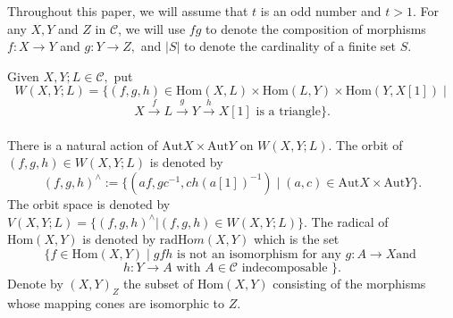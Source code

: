 \documentclass{amsart}
\theoremstyle{definition}
\numberwithin{equation}{section}
\begin{document}
Throughout this paper, we will assume that $t$ is an odd number and
$t>1.$ For any $X, Y$ and $Z$ in ${{\mathcal{C}}}$, we will use $fg$ to denote
the composition of morphisms $f:X\rightarrow Y$ and $g:Y\rightarrow
Z,$ and $|S|$ to denote the cardinality of a finite set $S.$

Given $X,Y;L\in {{\mathcal{C}}},$ put
$$ W(X,Y;L)=\{(f,g,h)\in {\mathrm{Hom}}(X,L)\times
{\mathrm{Hom}}(L,Y)\times {\mathrm{Hom}}(Y,X[1])\mid$$$$
X\xrightarrow{f}L\xrightarrow{g}Y\xrightarrow{h}X[1] \mbox{ is a
triangle}\}.$$ \\
There is a natural action of ${\mbox{Aut}} X\times {\mbox{Aut}} Y$ on $W(X,Y;L).$
The orbit of $(f,g,h)\in W(X,Y;L)$ is denoted by
$$(f,g,h)^{\wedge}:=\{(af,gc^{-1},ch(a[1])^{-1})\mid (a,c)\in {\mbox{Aut}} X\times {\mbox{Aut}} Y\}.$$
The orbit space is denoted by $V(X,Y;L)=\{ (f,g,h)^{\wedge}|(f,g,h)
\in W(X,Y;L)\} .$ The radical of ${\mathrm{Hom}}(X, Y)$ is denoted by
$\mathrm{radHo}m(X, Y)$ which is the set $$\{f\in {\mathrm{Hom}}(X, Y)\mid gfh
\mbox{ is not an isomorphism }\mbox{for any }g: A\rightarrow X\mbox{
and }
$$
$$h:Y\rightarrow A\mbox{ with } A\in {{\mathcal{C}}}\mbox{ indecomposable }\}. $$ Denote by $(X,Y)_Z$ the subset of ${\mathrm{Hom}}(X,Y)$
consisting of the morphisms whose mapping cones are isomorphic to
$Z.$
\end{document}
